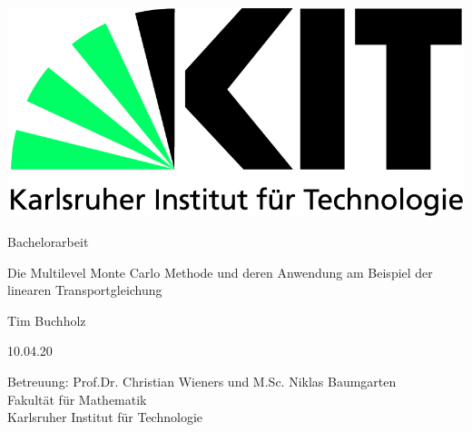 \documentclass[12pt,a4paper]{scrartcl}
\theoremstyle{definition}
\numberwithin{equation}{section}
\begin{document}
  \pagestyle{empty}
  
  
  \begin{titlepage}

    \includegraphics[scale=0.45]{kit-logo.jpg} 
    \vspace*{2cm} 

 \begin{center} \large 
    
    Bachelorarbeit
    \vspace*{2cm}

    {\huge Die Multilevel Monte Carlo Methode und deren Anwendung am Beispiel der linearen Transportgleichung}
    \vspace*{2.5cm}

    Tim Buchholz
    \vspace*{1.5cm}

    10.04.20
    \vspace*{4.5cm}


    Betreuung: Prof.Dr. Christian Wieners und M.Sc. Niklas Baumgarten \\[1cm]
    Fakultät für Mathematik \\[1cm]
		Karlsruher Institut für Technologie
  \end{center}
\end{titlepage}



  \tableofcontents

\newpage
 


  \pagestyle{headings}



%

 \newpage  %
 
\end{document}
